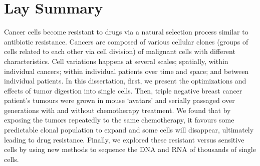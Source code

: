 

 \chapter{Lay Summary}

Cancer cells become resistant to drugs via a natural selection process similar to antibiotic resistance. Cancers are composed of various cellular clones (groups of cells related to each other via cell division) of malignant cells with different characteristics. Cell variations happens at several scales; spatially, within individual cancers; within individual patients over time and space; and between individual patients. In this dissertation, first, we present the optimizations and effects of tumor digestion into single cells. Then, triple negative breast cancer patient's tumours were grown in mouse `avatars' and serially passaged over generations with and without chemotherapy treatment. We found that by exposing the tumors repeatedly to the same chemotherapy, it favours some predictable clonal population to expand and some cells will disappear, ultimately leading to drug resistance. Finally, we explored these resistant versus sensitive cells by using new methods to sequence the DNA and RNA of thousands of single cells.




